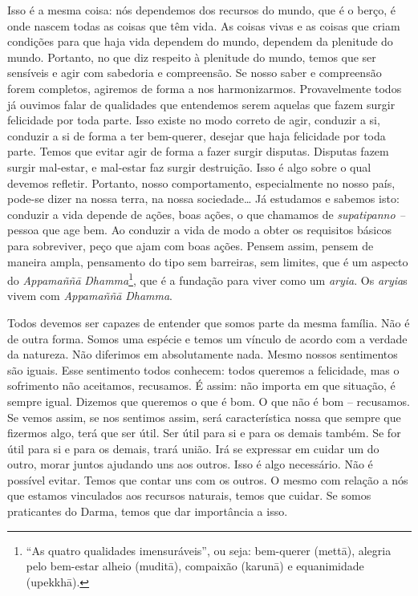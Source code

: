 Isso é a mesma coisa: nós dependemos dos recursos do mundo, que é o
berço, é onde nascem todas as coisas que têm vida. As coisas vivas e as
coisas que criam condições para que haja vida dependem do mundo,
dependem da plenitude do mundo. Portanto, no que diz respeito à
plenitude do mundo, temos que ser sensíveis e agir com sabedoria e
compreensão. Se nosso saber e compreensão forem completos, agiremos de
forma a nos harmonizarmos. Provavelmente todos já ouvimos falar de
qualidades que entendemos serem aquelas que fazem surgir felicidade por
toda parte. Isso existe no modo correto de agir, conduzir a si,
conduzir a si de forma a ter bem-querer, desejar que haja felicidade
por toda parte. Temos que evitar agir de forma a fazer surgir disputas.
Disputas fazem surgir mal-estar, e mal-estar faz surgir destruição.
Isso é algo sobre o qual devemos refletir. Portanto, nosso
comportamento, especialmente no nosso país, pode-se dizer na nossa
terra, na nossa sociedade… Já estudamos e sabemos isto: conduzir a vida
depende de ações, boas ações, o que chamamos de \textit{supatipanno –
}pessoa que age bem. Ao conduzir a vida de modo a obter os requisitos
básicos para sobreviver, peço que ajam com boas ações. Pensem assim,
pensem de maneira ampla, pensamento do tipo sem barreiras, sem limites,
que é um aspecto do \textit{Appamaññ\=a} \textit{Dhamma}\footnote{“As
quatro qualidades imensuráveis”, ou seja: bem-querer (mett\=a), alegria
pelo bem-estar alheio (mudit\=a), compaixão (karun\=a) e equanimidade
(upekkh\=a).}, que é a fundação para viver como um \textit{aryia}. Os
\textit{aryia}s vivem com \textit{Appamaññ\=a} \textit{Dhamma}. 

Todos devemos ser capazes de entender que somos parte da mesma
família. Não é de outra forma. Somos uma espécie e temos um vínculo de
acordo com a verdade da natureza. Não diferimos em absolutamente nada.
Mesmo nossos sentimentos são iguais. Esse sentimento todos conhecem:
todos queremos a felicidade, mas o sofrimento não aceitamos, recusamos.
É assim: não importa em que situação, é sempre igual. Dizemos que
queremos o que é bom. O que não é bom – recusamos. Se vemos assim, se
nos sentimos assim, será característica nossa que sempre que fizermos
algo, terá que ser útil. Ser útil para si e para os demais também. Se
for útil para si e para os demais, trará união. Irá se expressar em
cuidar um do outro, morar juntos ajudando uns aos outros. Isso é algo
necessário. Não é possível evitar. Temos que contar uns com os outros.
O mesmo com relação a nós que estamos vinculados aos recursos naturais,
temos que cuidar. Se somos praticantes do Darma, temos que dar
importância a isso. 

